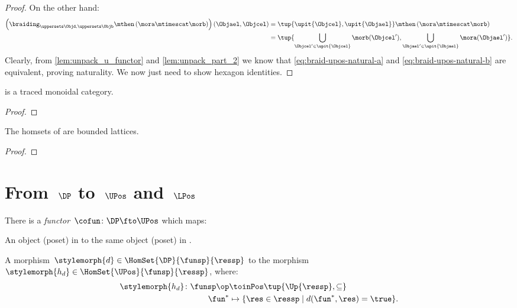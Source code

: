 \begin{proof}
    On the other hand:
    \begin{equation}
        \label{eq:braid-upos-natural-b}
    \begin{aligned}
        \left(\braiding_{\uppersets \Objd, \uppersets \Objb}\mthen \left( \mora \mtimescat \morb\right)\right)(\Objael,\Objcel)&=
        \tup{\upit\{\Objcel\},\upit\{\Objael\}}\mthen \left( \mora \mtimescat \morb\right)\\
        &=\tup{\bigcup_{\Objcel'\in \upit\{\Objcel\}} \morb(\Objcel'),\bigcup_{\Objael'\in \upit\{\Objael\}}\mora(\Objael')}.
    \end{aligned}
    \end{equation}
    Clearly, from \cref{lem:unpack_u_functor} and \cref{lem:unpack_part_2} we know that \cref{eq:braid-upos-natural-a} and \cref{eq:braid-upos-natural-b} are equivalent, proving naturality.
    We now just need to show hexagon identities.
\end{proof}

\begin{lemma}\label{lem:UPos-is-traced}
  \UPos is a traced monoidal category.
\end{lemma}
\begin{proof}
\end{proof}

\begin{lemma}\label{lem:UPos-is-traced}
    The homsets of \UPos are bounded lattices.
  \end{lemma}
  \begin{proof}
  \end{proof}
  
  

\section{From~$\DP$ to~$\UPos$ and~$\LPos$}
\begin{lemma}
\label{lem:covfunctor}
There is a \emph{functor}~$\cofun\colon \DP \fto \UPos$ which maps:
\begin{compactenum}
\item An object (poset) in \DP to the same object (poset) in \UPos.
\item A morphism~$\stylemorph{d}\in \HomSet{\DP}{\funsp}{\ressp}$ to the morphism~$\stylemorph{h_d}\in \HomSet{\UPos}{\funsp}{\ressp}$, where:
\begin{equation}
\begin{aligned}
    \stylemorph{h_d}\colon \funsp\op &\toinPos \tup{\Up{\ressp},\subseteq}\\
    \fun^*&\mapsto \{\res \in \ressp\mid d(\fun^*,\res)=\true\}.
\end{aligned}
\end{equation}
\end{compactenum}
\end{lemma}

